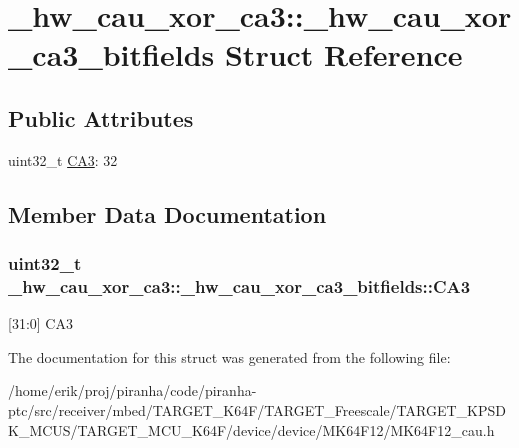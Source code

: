 \hypertarget{struct__hw__cau__xor__ca3_1_1__hw__cau__xor__ca3__bitfields}{}\section{\+\_\+hw\+\_\+cau\+\_\+xor\+\_\+ca3\+:\+:\+\_\+hw\+\_\+cau\+\_\+xor\+\_\+ca3\+\_\+bitfields Struct Reference}
\label{struct__hw__cau__xor__ca3_1_1__hw__cau__xor__ca3__bitfields}
\subsection*{Public Attributes}
\begin{DoxyCompactItemize}
\item 
uint32\+\_\+t \hyperlink{struct__hw__cau__xor__ca3_1_1__hw__cau__xor__ca3__bitfields_aa83926ea5a74f9947dd26e7093633a7f}{C\+A3}\+: 32
\end{DoxyCompactItemize}


\subsection{Member Data Documentation}
\subsubsection[{\texorpdfstring{C\+A3}{CA3}}]{\setlength{\rightskip}{0pt plus 5cm}uint32\+\_\+t \+\_\+hw\+\_\+cau\+\_\+xor\+\_\+ca3\+::\+\_\+hw\+\_\+cau\+\_\+xor\+\_\+ca3\+\_\+bitfields\+::\+C\+A3}\hypertarget{struct__hw__cau__xor__ca3_1_1__hw__cau__xor__ca3__bitfields_aa83926ea5a74f9947dd26e7093633a7f}{}\label{struct__hw__cau__xor__ca3_1_1__hw__cau__xor__ca3__bitfields_aa83926ea5a74f9947dd26e7093633a7f}
\mbox{[}31\+:0\mbox{]} C\+A3 

The documentation for this struct was generated from the following file\+:\begin{DoxyCompactItemize}
\item 
/home/erik/proj/piranha/code/piranha-\/ptc/src/receiver/mbed/\+T\+A\+R\+G\+E\+T\+\_\+\+K64\+F/\+T\+A\+R\+G\+E\+T\+\_\+\+Freescale/\+T\+A\+R\+G\+E\+T\+\_\+\+K\+P\+S\+D\+K\+\_\+\+M\+C\+U\+S/\+T\+A\+R\+G\+E\+T\+\_\+\+M\+C\+U\+\_\+\+K64\+F/device/device/\+M\+K64\+F12/M\+K64\+F12\+\_\+cau.\+h\end{DoxyCompactItemize}
